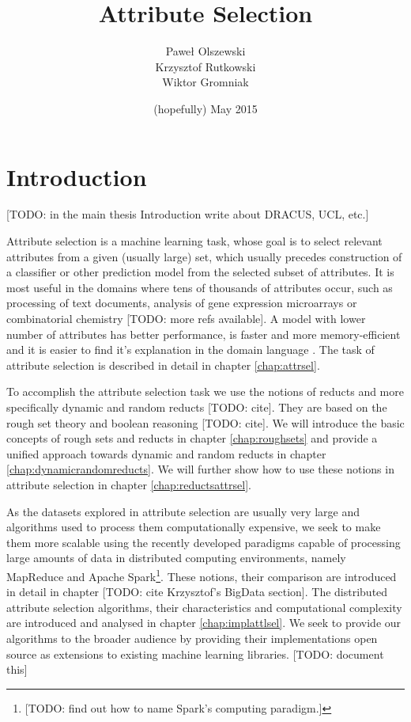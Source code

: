 \documentclass[12pt]{report}
\title{Attribute Selection}
\author{Pawe\l{} Olszewski\\
        Krzysztof Rutkowski\\
        Wiktor Gromniak}
\date{(hopefully) May 2015}
\begin{document}
\maketitle
\tableofcontents

\chapter{Introduction}

[TODO: in the main thesis Introduction write about DRACUS, UCL, etc.]

Attribute selection is a machine learning task, whose goal is to select relevant attributes from a given (usually large) set, which usually precedes construction of a classifier or other prediction model from the selected subset of attributes. It is most useful in the domains where tens of thousands of attributes occur, such as processing of text documents, analysis of gene expression microarrays or combinatorial chemistry \cite{guyon} [TODO: more refs available]. A model with lower number of attributes has better performance, is faster and more memory-efficient and it is easier to find it's explanation in the domain language \cite{guyon}. The task of attribute selection is described in detail in chapter \ref{chap:attrsel}.

To accomplish the attribute selection task we use the notions of reducts and more specifically dynamic and random reducts [TODO: cite]. They are based on the rough set theory and boolean reasoning [TODO: cite]. We will introduce the basic concepts of rough sets and reducts in chapter \ref{chap:roughsets} and provide a unified approach towards dynamic and random reducts in chapter \ref{chap:dynamicrandomreducts}. We will further show how to use these notions in attribute selection in chapter \ref{chap:reductsattrsel}.

As the datasets explored in attribute selection are usually very large and algorithms used to process them computationally expensive, we seek to make them more scalable using the recently developed paradigms capable of processing large amounts of data in distributed computing environments, namely MapReduce and Apache Spark\footnote{[TODO: find out how to name Spark's computing paradigm.]}. These notions, their comparison are introduced in detail in chapter [TODO: cite Krzysztof's BigData section]. The distributed attribute selection algorithms, their characteristics and computational complexity are introduced and analysed in chapter \ref{chap:implattlsel}. We seek to provide our algorithms to the broader audience by providing their implementations open source as extensions to existing machine learning libraries. [TODO: document this]
\end{document}
